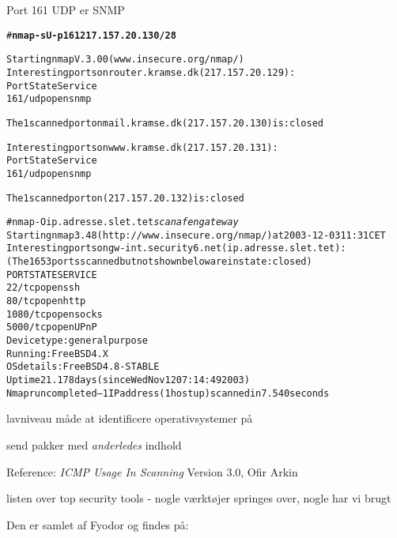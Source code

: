 \documentclass[Screen16to9,17pt]{foils}
\begin{document}

\begin{list1}
  \item Port 161 UDP er SNMP
\end{list1}

\begin{alltt}
\small # {\bfseries nmap -sU -p 161 217.157.20.130/28}

Starting nmap V. 3.00 ( www.insecure.org/nmap/ )
Interesting ports on router.kramse.dk (217.157.20.129):
Port       State       Service
161/udp    open        snmp

The 1 scanned port on mail.kramse.dk (217.157.20.130) is: closed

Interesting ports on www.kramse.dk (217.157.20.131):
Port       State       Service
161/udp    open        snmp

The 1 scanned port on  (217.157.20.132) is: closed
\end{alltt}

\begin{alltt}
\footnotesize
# nmap -O ip.adresse.slet.tet \emph{scan af en gateway}
Starting nmap 3.48 ( http://www.insecure.org/nmap/ ) at 2003-12-03 11:31 CET
Interesting ports on gw-int.security6.net (ip.adresse.slet.tet):
(The 1653 ports scanned but not shown below are in state: closed)
PORT     STATE SERVICE
22/tcp   open  ssh
80/tcp   open  http
1080/tcp open  socks
5000/tcp open  UPnP
Device type: general purpose
Running: FreeBSD 4.X
OS details: FreeBSD 4.8-STABLE
Uptime 21.178 days (since Wed Nov 12 07:14:49 2003)
Nmap run completed -- 1 IP address (1 host up) scanned in 7.540 seconds
\end{alltt}

\begin{list2}
  \item lavniveau måde at identificere operativsystemer på
\item send pakker med \emph{anderledes} indhold
\item Reference: \emph{ICMP Usage In Scanning} Version 3.0,
  Ofir Arkin\\ 
\end{list2}


\begin{list1}
\item listen over top security
  tools - nogle værktøjer springes over, nogle har vi brugt
\item Den er samlet af Fyodor og findes på:\\
\end{list1}
\end{document}
